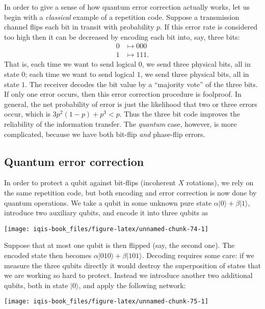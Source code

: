 \documentclass[fleqn]{article}
\begin{document}
In order to give a sense of how quantum error correction actually works, let us begin with a \emph{classical} example of a repetition code.
Suppose a transmission channel flips each bit in transit with probability \(p\).
If this error rate is considered too high then it can be decreased by encoding each bit into, say, three bits:
\[
  \begin{aligned}
    0 &\mapsto 000
  \\1 &\mapsto 111.
  \end{aligned}
\]
That is, each time we want to send logical \(0\), we send three physical bits, all in state \(0\); each time we want to send logical \(1\), we send three physical bits, all in state \(1\).
The receiver decodes the bit value by a ``majority vote'' of the three bits.
If only one error occurs, then this error correction procedure is foolproof.
In general, the net probability of error is just the likelihood that two or three errors occur, which is \(3p^2(1-p) + p^3 < p\).
Thus the three bit code improves the reliability of the information transfer.
The \emph{quantum} case, however, is more complicated, because we have both bit-flip \emph{and} phase-flip errors.

\hypertarget{quantum-error-correction}{%
\subsection{Quantum error correction}\label{quantum-error-correction}}

In order to protect a qubit against bit-flips (incoherent \(X\) rotations), we rely on the same repetition code, but both encoding and error correction is now done by quantum operations.
We take a qubit in some unknown pure state \(\alpha|0\rangle + \beta|1\rangle\), introduce two auxiliary qubits, and encode it into three qubits as

\begin{center}\texttt{[image: iqis-book\_files/figure-latex/unnamed-chunk-74-1]} \end{center}

Suppose that at most one qubit is then flipped (say, the second one).
The encoded state then becomes \(\alpha|010\rangle + \beta|101\rangle\).
Decoding requires some care: if we measure the three qubits directly it would destroy the superposition of states that we are working so hard to protect.
Instead we introduce another two additional qubits, both in state \(|0\rangle\), and apply the following network:

\begin{center}\texttt{[image: iqis-book\_files/figure-latex/unnamed-chunk-75-1]} \end{center}
\end{document}
